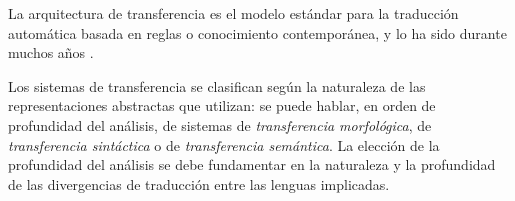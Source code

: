 La arquitectura de transferencia es el modelo estándar para la traducción automática basada en reglas o conocimiento contemporánea, y lo ha sido durante muchos años \citep{arnold93j}. 

Los sistemas de transferencia se clasifican según la naturaleza de las representaciones abstractas que utilizan: se puede hablar, en orden de profundidad del análisis, de sistemas de \emph{transferencia morfológica}, de \emph{transferencia sintáctica} o de {\em transferencia semántica}. La elección de la profundidad del análisis se debe fundamentar en la naturaleza y la profundidad de las divergencias de traducción \citep{vandooren93b} entre las lenguas implicadas. 

